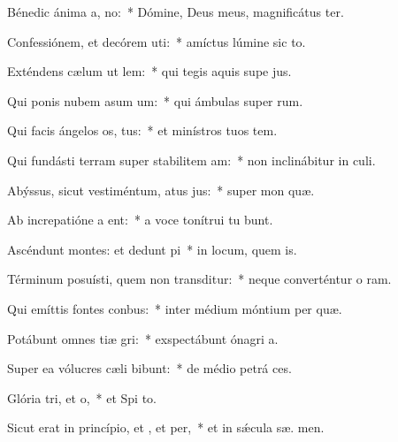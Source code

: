 \item Bénedic ánima a, no:~* Dómine, Deus meus, magnificátus  ter.
\item Confessiónem, et decórem uti:~* amíctus lúmine sic to.
\item Exténdens cælum ut lem:~* qui tegis aquis supe jus.
\item Qui ponis nubem asum um:~* qui ámbulas super  rum.
\item Qui facis ángelos os, tus:~* et minístros tuos  tem.
\item Qui fundásti terram super stabilitem am:~* non inclinábitur in  culi.
\item Abýssus, sicut vestiméntum, atus jus:~* super mon  quæ.
\item Ab increpatióne a ent:~* a voce tonítrui tu bunt.
\item Ascéndunt montes: et dedunt pi~* in locum, quem  is.
\item Términum posuísti, quem non transditur:~* neque converténtur o ram.
\item Qui emíttis fontes  conbus:~* inter médium móntium per quæ.
\item Potábunt omnes tiæ gri:~* exspectábunt ónagri   a.
\item Super ea vólucres cæli bibunt:~* de médio petrá  ces.
\item Glória tri, et o,~* et Spi to.
\item Sicut erat in princípio, et , et per,~* et in sǽcula sæ. men.
